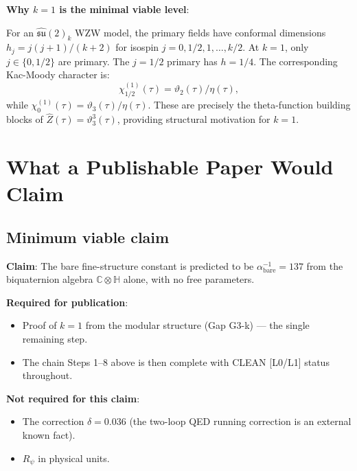 \documentclass[12pt,a4paper]{article}
\theoremstyle{definition}
\theoremstyle{remark}
\begin{document}
\begin{insightbox}
\textbf{Why $k = 1$ is the minimal viable level}:

For an $\hat{\mathfrak{su}}(2)_k$ WZW model, the primary fields have conformal
dimensions $h_j = j(j+1)/(k+2)$ for isospin $j = 0, 1/2, 1, \ldots, k/2$.
At $k = 1$, only $j \in \{0, 1/2\}$ are primary.  The $j = 1/2$ primary has
$h = 1/4$.  The corresponding Kac-Moody character is:
\begin{equation}
  \chi^{(1)}_{1/2}(\tau) = \vartheta_2(\tau)/\eta(\tau),
  \label{eq:bc:char_k1}
\end{equation}
while $\chi^{(1)}_0(\tau) = \vartheta_3(\tau)/\eta(\tau)$.  These are precisely
the theta-function building blocks of $\hat{Z}(\tau) = \vartheta_3^3(\tau)$,
providing structural motivation for $k = 1$.
\end{insightbox}

\section{What a Publishable Paper Would Claim}
\label{sec:bc:publication}

\subsection{Minimum viable claim}

\noindent\textbf{Claim}: The bare fine-structure constant is predicted to be
$\alpha^{-1}_{\mathrm{bare}} = 137$ from the biquaternion algebra $\mathbb{C}\otimes\mathbb{H}$
alone, with no free parameters.

\noindent\textbf{Required for publication}:
\begin{itemize}
  \item Proof of $k = 1$ from the modular structure (Gap G3-k) — the single remaining step.
  \item The chain Steps 1–8 above is then complete with CLEAN [L0/L1] status throughout.
\end{itemize}

\noindent\textbf{Not required for this claim}:
\begin{itemize}
  \item The correction $\delta = 0.036$ (the two-loop QED running correction is an external known fact).
  \item $R_\psi$ in physical units.
\end{itemize}
\end{document}
